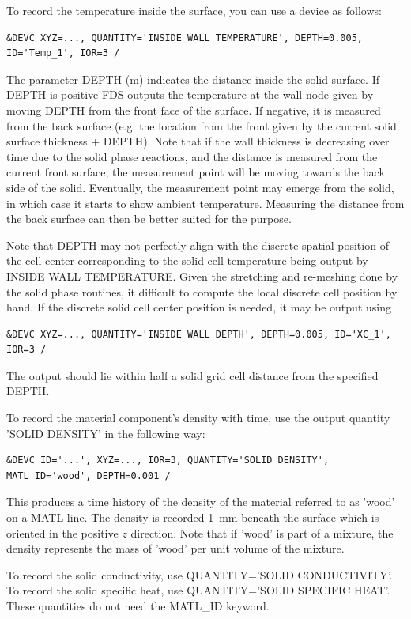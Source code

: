 \documentclass[11pt]{book}
\begin{document}
To record the temperature inside the surface, you can use a device as follows:
\begin{lstlisting}
&DEVC XYZ=..., QUANTITY='INSIDE WALL TEMPERATURE', DEPTH=0.005, ID='Temp_1', IOR=3 /
\end{lstlisting}
The parameter {\ct DEPTH} (m) indicates the distance inside the solid surface. If {\ct DEPTH} is positive FDS outputs the temperature at the wall node given by moving {\ct DEPTH} from the front face of the surface. If negative, it is measured from the back surface (e.g. the location from the front given by the current solid surface thickness + {\ct DEPTH}). Note that if the wall thickness is decreasing over time due to the solid phase reactions, and the distance is measured from the current front surface, the measurement point will be moving towards the back side of the solid. Eventually, the measurement point may emerge from the solid, in which case it starts to show ambient temperature. Measuring the distance from the back surface can then be better suited for the purpose.

Note that {\ct DEPTH} may not perfectly align with the discrete spatial position of the cell center corresponding to the solid cell temperature being output by {\ct INSIDE WALL TEMPERATURE}.  Given the stretching and re-meshing done by the solid phase routines, it difficult to compute the local discrete cell position by hand.  If the discrete solid cell center position is needed, it may be output using
\begin{lstlisting}
&DEVC XYZ=..., QUANTITY='INSIDE WALL DEPTH', DEPTH=0.005, ID='XC_1', IOR=3 /
\end{lstlisting}
The output should lie within half a solid grid cell distance from the specified {\ct DEPTH}.

To record the material component's density with time, use the output quantity {\ct 'SOLID DENSITY'} in the following way:
\begin{lstlisting}
&DEVC ID='...', XYZ=..., IOR=3, QUANTITY='SOLID DENSITY', MATL_ID='wood', DEPTH=0.001 /
\end{lstlisting}
This produces a time history of the density of the material referred to as {\ct 'wood'} on a {\ct MATL} line. The density is recorded 1~mm beneath the surface which is oriented in the positive $z$ direction. Note that if {\ct 'wood'} is part of a mixture, the density represents the mass of {\ct 'wood'} per unit volume of the mixture.

To record the solid conductivity, use {\ct QUANTITY='SOLID CONDUCTIVITY'}. To record the solid specific heat, use {\ct QUANTITY='SOLID SPECIFIC HEAT'}. These quantities do not need the {\ct MATL\_ID} keyword.
\end{document}
